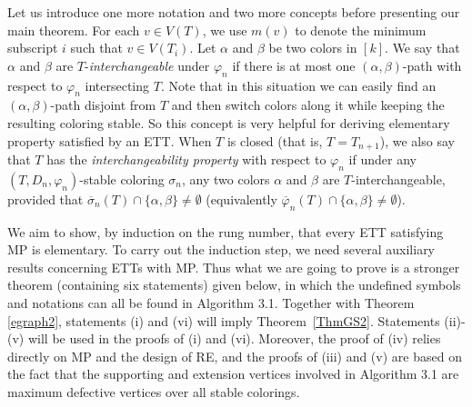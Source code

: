\documentclass[11pt]{article}
\newcommand{\phibar}{\overline{\varphi}}
\newcommand{\phiv}{\varphi}
\begin{document}
Let us introduce one more notation and two more concepts before presenting our main theorem. For each $v\in V(T)$, we use $m(v)$ to denote the minimum 
subscript $i$ such that $v \in V(T_i)$. Let $\alpha$ and $\beta$ be two colors in $[k]$. We say that $\alpha$ and $\beta$ are
$T$-{\em interchangeable}\label{interchangable} under $\varphi_n$ if there is at most one $(\alpha, \beta)$-path with respect to $\varphi_n$
intersecting $T$. Note that in this situation we can easily find an $(\alpha, \beta)$-path disjoint from $T$ and then switch 
colors along it while keeping the resulting coloring stable. So this concept is very helpful for deriving elementary property satisfied 
by an ETT.  When $T$ is closed (that is, $T=T_{n+1}$), we also say that $T$ has the {\em interchangeability 
property}\label{interchangeproperty} with respect to $\varphi_{n}$ if under any $(T, D_n, \phiv_{n})$-stable coloring $\sigma_n$, any two 
colors $\alpha$ and $\beta$ are $T$-interchangeable, provided that $\overline{\sigma}_n(T) \cap \{\alpha, \beta\} 
\ne \emptyset$ (equivalently $\phibar_{n}(T) \cap \{\alpha, \beta\} \ne \emptyset$).    

We aim to show, by induction on the rung number, that every ETT satisfying MP is elementary. To carry out the induction step, we need several 
auxiliary results concerning ETTs with MP. Thus what we are going to prove is a stronger theorem (containing six statements) given below, 
in which the undefined symbols and notations can all be found in Algorithm 3.1. Together with Theorem \ref{egraph2}, statements (i) and 
(vi) will imply Theorem~\ref{ThmGS2}. Statements (ii)-(v) will be used in the proofs of (i) and (vi). Moreover, the proof of (iv) relies 
directly on MP and the design of RE, and the proofs of (iii) and (v) are based on the fact that the supporting and extension vertices 
involved in Algorithm 3.1 are maximum defective vertices over all stable colorings.
\end{document}
